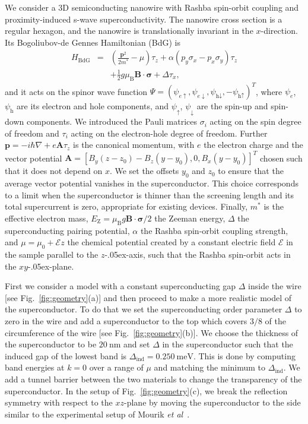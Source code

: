 We consider a 3D semiconducting nanowire with Rashba spin-orbit coupling and proximity-induced s-wave superconductivity.
The nanowire cross section is a regular hexagon, and the nanowire is translationally invariant in the $x$-direction.
Its Bogoliubov-de Gennes Hamiltonian (BdG) is
\begin{eqnarray}
H_\textrm{BdG} & = & \left(\frac{\mathbf{p}^{2}}{2m^*}-\mu\right)\tau_z+\alpha\left(p_{y}\sigma_x -p_{x}\sigma_y \right)\tau_z\nonumber \\
 &  & +\frac{1}{2}g\mu_\textrm{B}\mathbf{B}\cdot\boldsymbol{\sigma}+\Delta\tau_x,\label{eq:H_BdG}
\end{eqnarray}
and it acts on the spinor wave function $\Psi={\left(\psi_{e\uparrow},\psi_{e\downarrow},\psi_{\textrm{h}\downarrow},-\psi_{\textrm{h}\uparrow}\right)}^{T}$, where $\psi_e$, $\psi_\textrm{h}$ are its electron and hole components, and $\psi_\uparrow$, $\psi_\downarrow$ are the spin-up and spin-down components.
We introduced the Pauli matrices $\sigma_{i}$ acting on the spin degree of freedom and $\tau_{i}$ acting on the electron-hole degree of freedom.
Further $\mathbf{p}=-i\hbar\nabla+e\mathbf{A}\tau_z$ is the canonical momentum, with $e$ the electron charge and the vector potential $\mathbf{A}={\left[ B_y (z - z_0) - B_z (y - y_0), 0, B_x (y - y_0)\right]}^{T}$ chosen such that it does not depend on $x$.
We set the offsets $y_0$ and $z_0$ to ensure that the average vector potential vanishes in the superconductor.
This choice corresponds to a limit when the superconductor is thinner than the screening length and its total supercurrent is zero, appropriate for existing devices.
Finally, $m^*$ is the effective electron mass, $E_\textrm{Z}=\mu_\textrm{B}g\mathbf{B}\cdot\boldsymbol{\sigma}/2$ the Zeeman energy,  $\Delta$ the superconducting pairing potential, $\alpha$ the Rashba spin-orbit coupling strength, and $\mu=\mu_0+\mathcal{E} z$ the chemical potential created by a constant electric field $\mathcal{E}$ in the sample parallel to the $z$\kern-.05ex-axis, such that the Rashba spin-orbit acts in the $xy$\kern-.05ex-plane.


First we consider a model with a constant superconducting gap $\Delta$ inside the wire [see Fig.~\ref{fig:geometry}(a)] and then proceed to make a more realistic model of the superconductor.
To do that we set the superconducting order parameter $\Delta$ to zero in the wire and add a superconductor to the top which covers $3/8$ of the circumference of the wire [see Fig.~\ref{fig:geometry}(b)].
We choose the thickness of the superconductor to be $\SI{20}{\nano\metre}$ and set $\Delta$ in the superconductor such that the induced gap of the lowest band is $\Delta_\textrm{ind}=\SI{0.250}{\milli\electronvolt}$.
This is done by computing band energies at $k=0$ over a range of $\mu$ and matching the minimum to $\Delta_\textrm{ind}$.
We add a tunnel barrier between the two materials to change the transparency of the superconductor.
In the setup of Fig.~\ref{fig:geometry}(c), we break the reflection symmetry with respect to the $xz$-plane by moving the superconductor to the side similar to the experimental setup of Mourik \emph{et al}~\cite{Mourik2012}.

